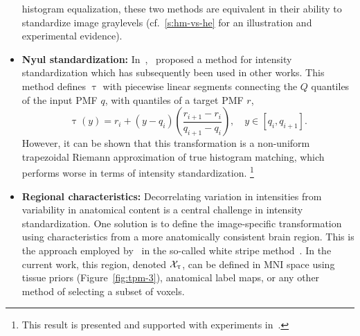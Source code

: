 \begin{itemize}
  histogram equalization, these two methods are equivalent in their ability
  to standardize image graylevels
  (cf.~\ref{s:hm-vs-he} for an illustration and experimental evidence).
  \item \textbf{Nyul standardization:}
  In~\cite{Nyul1999,Nyul2000},~\citeauthor{Nyul1999} proposed a method for
  intensity standardization which has subsequently been used in other works. %
  This method defines $\uptau$ with piecewise linear segments
  connecting the $Q$ quantiles of the input PMF $q$, with quantiles of a target PMF $r$,
  \begin{equation}
    \uptau(y) = r_i + \left(y-q_i\right)
      \left(\frac{r_{i+1}-r_i}{q_{i+1}-q_i}\right),\quad y\in[q_i,q_{i+1}].
    \end{equation}
  However, it can be shown that this transformation is
  a non-uniform trapezoidal Riemann approximation of true histogram matching,
  which performs worse in terms of intensity standardization.%
  \footnote{This result is presented and supported with experiments in~\cite{Knight2017}.} %
  \item \textbf{Regional characteristics:}
  Decorrelating variation in intensities from variability in anatomical content
  is a central challenge in intensity standardization.
  One solution is to define the image-specific transformation using characteristics
  from a more anatomically consistent brain region.
  This is the approach employed by~\citeauthor{Shinohara2014}
  in the so-called white stripe method~\cite{Shinohara2014}.
  In the current work, this region, denoted $\mathcal{X}_{\uptau}$,
  can be defined in MNI space using tissue priors (Figure~\ref{fig:tpm-3}),
  anatomical label maps, or any other method of selecting a subset of voxels.
\end{itemize}
